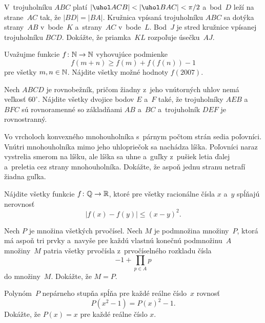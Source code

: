 {%
V~trojuholníku $ABC$ platí $|\uhol ACB|<|\uhol BAC|<\pi/2$ a~bod~$D$ leží na strane~$AC$ tak, že $|BD|=|BA|$. Kružnica vpísaná trojuholníku $ABC$ sa dotýka strany~$AB$ v~bode~$K$ a~strany~$AC$ v~bode~$L$. Bod~$J$ je stred kružnice vpísanej trojuholníku $BCD$. Dokážte, že priamka~$KL$ rozpoľuje úsečku~$AJ$.
}

{%
Uvažujme funkcie $f\colon\Bbb N\to\Bbb N$ vyhovujúce podmienke
$$
f(m+n)\geq f(m)+f(f(n))-1
$$
pre všetky $m,n\in\Bbb N$. Nájdite všetky možné hodnoty $f(2007)$.
}

{%
Nech $ABCD$ je rovnobežník, pričom žiadny z~jeho vnútorných uhlov nemá veľkosť $60^\circ$. Nájdite všetky dvojice bodov $E$ a~$F$ také, že trojuholníky $AEB$ a~$BFC$ sú rovnoramenné so základňami $AB$ a~$BC$ a~trojuholník $DEF$ je rovnostranný.}

{%
Vo vrcholoch konvexného mnohouholníka s~párnym počtom strán sedia poľovníci. Vnútri mnohouholníka mimo jeho uhlopriečok sa nachádza líška. Poľovníci naraz vystrelia smerom na líšku, ale líška sa uhne a~guľky z~pušiek letia ďalej a~preletia cez strany mnohouholníka. Dokážte, že aspoň jednu stranu netrafí žiadna guľka.}

{%
Nájdite všetky funkcie $f\colon\Bbb Q\to\Bbb R$, ktoré pre všetky racionálne čísla $x$ a~$y$ spĺňajú nerovnosť
$$
|f(x)-f(y)|\le (x-y)^2.
$$}

{%
Nech $P$ je množina všetkých prvočísel. Nech $M$ je podmnožina množiny~$P$, ktorá má aspoň tri prvky a~navyše pre každú vlastnú konečnú podmnožinu~$A$ množiny~$M$ patria všetky prvočísla z~prvočíselného rozkladu čísla
$$
-1 + \prod_{p\in A} p
$$
do množiny~$M$. Dokážte, že $M=P$.}

{%
Polynóm~$P$ nepárneho stupňa spĺňa pre každé reálne číslo~$x$ rovnosť
$$
P(x^2-1)=P(x)^2-1.
$$
Dokážte, že $P(x)=x$ pre každé reálne číslo $x$.}

